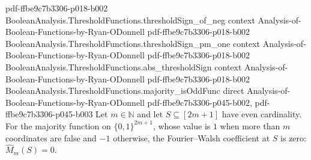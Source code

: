 \begin{theorem}
  {pdf-ffbe9c7b3306-p018-b002}
\proofstep
  {BooleanAnalysis.ThresholdFunctions.thresholdSign_of_neg}
  {context}
  {Analysis-of-Boolean-Functions-by-Ryan-ODonnell}
  {pdf-ffbe9c7b3306-p018-b002}
\proofstep
  {BooleanAnalysis.ThresholdFunctions.thresholdSign_pm_one}
  {context}
  {Analysis-of-Boolean-Functions-by-Ryan-ODonnell}
  {pdf-ffbe9c7b3306-p018-b002}
\proofstep
  {BooleanAnalysis.ThresholdFunctions.abs_thresholdSign}
  {context}
  {Analysis-of-Boolean-Functions-by-Ryan-ODonnell}
  {pdf-ffbe9c7b3306-p018-b002}
\proofstep
  {BooleanAnalysis.ThresholdFunctions.majority_isOddFunc}
  {direct}
  {Analysis-of-Boolean-Functions-by-Ryan-ODonnell}
  {pdf-ffbe9c7b3306-p045-b002,
    pdf-ffbe9c7b3306-p045-b003}
Let $m\in\mathbb N$ and let $S\subseteq[2m+1]$ have even cardinality. For the majority
function on $\{0,1\}^{2m+1}$, whose value is $1$ when more than $m$ coordinates are
false and $-1$ otherwise, the Fourier--Walsh coefficient at $S$ is zero: $\widehat
M_m(S)=0$.
\end{theorem}


